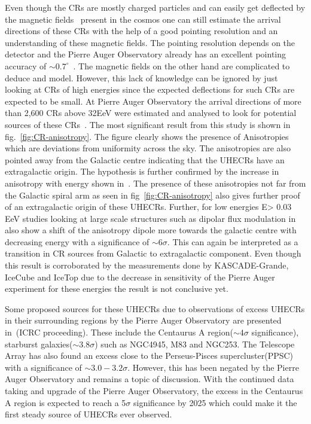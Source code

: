 Even though the CRs are mostly charged particles and can easily get deflected by the magnetic fields~\cite{Ar_mburo_Garc_a_2021} present in the cosmos one can still estimate the arrival directions of these CRs with the help of a good pointing resolution and an understanding of these magnetic fields. The pointing resolution depends on the detector and the Pierre Auger Observatory already has an excellent pointing accuracy of $\sim 0.7^{\circ}$~\cite{BONIFAZI200920}. The magnetic fields on the other hand are complicated to deduce and model. However, this lack of knowledge can be ignored by just looking at CRs of high energies since the expected deflections for such CRs are expected to be small. At Pierre Auger Observatory the arrival directions of more than 2,600 CRs above 32EeV were estimated and analysed to look for potential sources of these CRs~\cite{Abreu_2022}. The most significant result from this study is shown in fig.~\ref{fig:CR-anisotropy}. The figure clearly shows the presence of Anisotropies which are deviations from uniformity across the sky. The anisotropies are also pointed away from the Galactic centre indicating that the UHECRs have an extragalactic origin. The hypothesis is further confirmed by the increase in anisotropy with energy shown in~\cite{Abreu_2022}. The presence of these anisotropies not far from the Galactic spiral arm as seen in fig~\ref{fig:CR-anisotropy} also gives further proof of an extragalactic origin of these UHECRs. Further, for low energies E> 0.03 EeV studies looking at large scale structures such as dipolar flux modulation in~\cite{Aab_2020_dipole_modulation} also show a shift of the anisotropy dipole more towards the galactic centre with decreasing energy with a significance of $\sim 6 \sigma$. This can again be interpreted as a transition in CR sources from Galactic to extragalactic component. Even though this result is corroborated by the measurements done by KASCADE-Grande, IceCube and IceTop due to the decrease in sensitivity of the Pierre Auger experiment for these energies the result is not conclusive yet.

Some proposed sources for these UHECRs due to observations of excess UHECRs in their surrounding regions by the Pierre Auger Observatory are presented in~\cite{TelescopeArray:2021gxg}(ICRC proceeding). These include the Centaurus A region($\sim 4\sigma$ significance), starburst galaxies($\sim 3.8\sigma$) such as NGC4945, M83 and NGC253. The Telescope Array has also found an excess close to the Perseus-Pisces supercluster(PPSC) with a significance of $\sim3.0-3.2\sigma$. However, this has been negated by the Pierre Auger Observatory and remains a topic of discussion. With the continued data taking and upgrade of the Pierre Auger Observatory, the excess in the Centaurus A region is expected to reach a 5$\sigma$ significance by 2025 which could make it the first steady source of UHECRs ever observed. 
 

